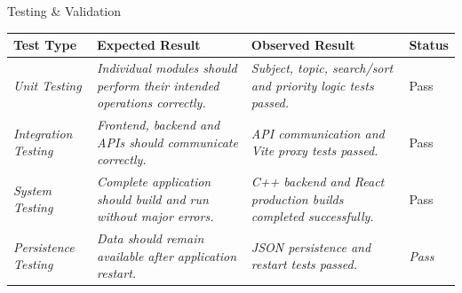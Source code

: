 \documentclass[aspectratio=169,11pt]{beamer}
\newcommand{\placeholder}[1]{%
\textit{\color{GEUGrey}#1}
}
\begin{document}
\begin{frame}{Testing \& Validation}

\scriptsize

\begin{center}

\renewcommand{\arraystretch}{1.35}

\begin{tabularx}{.96\textwidth}
{@{}p{2.0cm}X X p{1.4cm}@{}}

\toprule
Test Type &
Expected Result &
Observed Result &
Status\\
\midrule

\placeholder{Unit Testing} &
\placeholder{ Individual modules should perform their intended operations correctly.} &
\placeholder{Subject, topic, search/sort and priority logic tests passed. } &
Pass\\

\placeholder{Integration Testing} &
\placeholder{Frontend, backend and APIs should communicate correctly.} &
\placeholder{API communication and Vite proxy tests passed.} &
Pass\\

\placeholder{System Testing} &
\placeholder{Complete application should build and run without major errors.} &
\placeholder{C++ backend and React production builds completed successfully. } &
Pass\\

\placeholder{Persistence Testing} &
\placeholder{ Data should remain available after application restart.} &
\placeholder{JSON persistence and restart tests passed. } &
\placeholder{Pass}\\

\bottomrule

\end{tabularx}

\end{center}

\vspace{3mm}




\end{frame}
\end{document}
